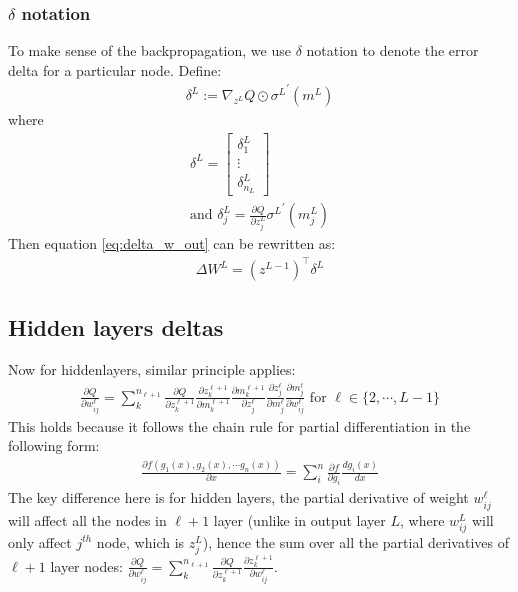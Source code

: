 \documentclass{article} [10pt] %
\begin{document}
\subsubsection{$\delta$ notation}
To make sense of the backpropagation, we use $\delta$ notation to denote the error delta for a particular node. Define:
\begin{align}
	\delta^L := \nabla_{z^L}Q \odot {\sigma^L}^\prime(m^L)
\end{align}
where
\begin{align}
	\delta^L = \begin{bmatrix} \delta^L_1\\ \vdots\\ \delta^L_{n_L}\end{bmatrix} \\
	\text{and } \delta^L_j =\frac{\partial Q}{\partial z^L_{j}}{\sigma^L}^\prime(m^L_{j}) \label{eq:node_delta_output}
\end{align}
Then equation \eqref{eq:delta_w_out} can be rewritten as:
\begin{align}
	\Delta W^L = (z^{L-1})^\top{\delta^L}
\end{align}

\subsection{Hidden layers deltas}
Now for hiddenlayers, similar principle applies:
\begin{align} \label{eq:hidden_delta}
\boxed{
	\frac{\partial Q}{\partial w^\ell_{ij}} = \sum_k^{n_{\ell+1}}\frac{\partial Q}{\partial z^{\ell+1}_{k}}
							\frac{\partial z^{\ell+1}_{k}}{\partial m^{\ell+1}_{k}}
							\frac{\partial m^{\ell+1}_{k}}{\partial z^\ell_j}
							\frac{\partial z^\ell_j}{\partial m^\ell_{j}}
							\frac{\partial m^\ell_{j}}{\partial w^\ell_{ij}}
\text{ for } \ell \in \{2, \cdots, L-1\}
}
\end{align}
This holds because it follows the chain rule for partial differentiation in the following form:
\begin{align*}
	\frac{\partial f(g_1(x), g_2(x), \cdots g_n(x))}{\partial x} = \sum_i^n \frac{\partial f}{\partial g_i}\frac{d g_i(x)}{dx}
\end{align*}
The key difference here is for hidden layers, the partial derivative of weight $w^\ell_{ij}$ will affect all the nodes in $\ell+1$ layer (unlike in output layer $L$, where $w^L_{ij}$ will only affect $j^{th}$ node, which is $z^L_j$), hence the sum over all the partial derivatives of $\ell+1$ layer nodes: $\frac{\partial Q}{\partial w^\ell_{ij}} = \sum_k^{n_{\ell+1}}\frac{\partial Q}{\partial z^{\ell+1}_{k}}\frac{\partial z^{\ell+1}_{k}}{\partial w^\ell_{ij}}$.
\end{document}
